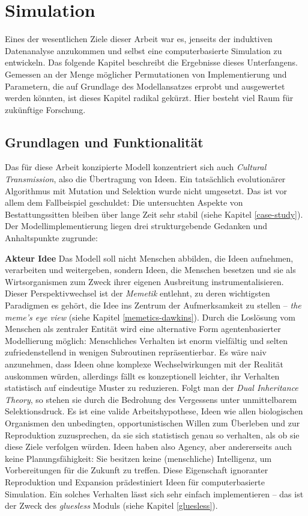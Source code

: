 \documentclass[openany,twoside,twocolumn]{book}
\begin{document}
\hypertarget{simulation}{%
\section{Simulation}\label{simulation}}

Eines der wesentlichen Ziele dieser Arbeit war es, jenseits der induktiven Datenanalyse anzukommen und selbst eine computerbasierte Simulation zu entwickeln. Das folgende Kapitel beschreibt die Ergebnisse dieses Unterfangens. Gemessen an der Menge möglicher Permutationen von Implementierung und Parametern, die auf Grundlage des Modellansatzes erprobt und ausgewertet werden könnten, ist dieses Kapitel radikal gekürzt. Hier besteht viel Raum für zukünftige Forschung.

\hypertarget{simulation-theorie}{%
\subsection{Grundlagen und Funktionalität}\label{simulation-theorie}}

Das für diese Arbeit konzipierte Modell konzentriert sich auch \emph{Cultural Transmission}, also die Übertragung von Ideen. Ein tatsächlich evolutionärer Algorithmus mit Mutation und Selektion wurde nicht umgesetzt. Das ist vor allem dem Fallbeispiel geschuldet: Die untersuchten Aspekte von Bestattungssitten bleiben über lange Zeit sehr stabil (siehe Kapitel \ref{case-study}). Der Modellimplementierung liegen drei strukturgebende Gedanken und Anhaltspunkte zugrunde:

\textbf{Akteur Idee} \newline 
Das Modell soll nicht Menschen abbilden, die Ideen aufnehmen, verarbeiten und weitergeben, sondern Ideen, die Menschen besetzen und sie als Wirtsorganismen zum Zweck ihrer eigenen Ausbreitung instrumentalisieren. Dieser Perspektivwechsel ist der \emph{Memetik} entlehnt, zu deren wichtigsten Paradigmen es gehört, die Idee ins Zentrum der Aufmerksamkeit zu stellen -- \emph{the meme's eye view} (siehe Kapitel \ref{memetics-dawkins}). Durch die Loslösung vom Menschen als zentraler Entität wird eine alternative Form agentenbasierter Modellierung möglich: Menschliches Verhalten ist enorm vielfältig und selten zufriedenstellend in wenigen Subroutinen repräsentierbar. Es wäre naiv anzunehmen, dass Ideen ohne komplexe Wechselwirkungen mit der Realität auskommen würden, allerdings fällt es konzeptionell leichter, ihr Verhalten statistisch auf eindeutige Muster zu reduzieren. Folgt man der \emph{Dual Inheritance Theory}, so stehen sie durch die Bedrohung des Vergessens unter unmittelbarem Selektionsdruck. Es ist eine valide Arbeitshypothese, Ideen wie allen biologischen Organismen den unbedingten, opportunistischen Willen zum Überleben und zur Reproduktion zuzusprechen, da sie sich statistisch genau so verhalten, als ob sie diese Ziele verfolgen würden. Ideen haben also Agency, aber andererseits auch keine Planungsfähigkeit: Sie besitzen keine (menschliche) Intelligenz, um Vorbereitungen für die Zukunft zu treffen. Diese Eigenschaft ignoranter Reproduktion und Expansion prädestiniert Ideen für computerbasierte Simulation. Ein solches Verhalten lässt sich sehr einfach implementieren -- das ist der Zweck des \emph{gluesless} Moduls (siehe Kapitel \ref{gluesless}).
\end{document}
